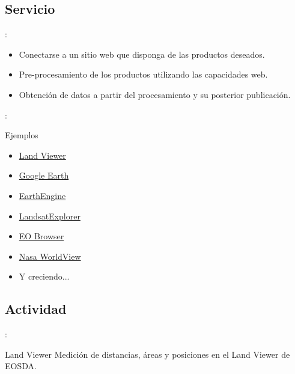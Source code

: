 \documentclass[]{beamer}
\begin{document}
\subsection{Servicio}
\begin{frame}{\secname : \subsecname}
    \begin{itemize}[<+->]
        \item Conectarse a un sitio web que disponga de las productos deseados.
        \item Pre-procesamiento de los productos utilizando las capacidades web.
        \item Obtención de datos a partir del procesamiento y su posterior publicación.
    \end{itemize}
\end{frame}

\begin{frame}{\secname : \subsecname}
    \begin{exampleblock}{Ejemplos}
        \begin{itemize}[<+->]
            \item \href{http://lv.eosda.com}{Land Viewer}
            \item \href{https://earth.google.com/web/}{Google Earth}
            \item \href{https://earthengine.google.com}{EarthEngine}
            \item \href{http://landsatexplorer.esri.com/}{LandsatExplorer}
            \item \href{http://apps.sentinel-hub.com/eo-browser/}{EO Browser}
            \item \href{https://worldview.earthdata.nasa.gov/}{Nasa WorldView}
            \item Y creciendo...
        \end{itemize}
    \end{exampleblock}
\end{frame}

\subsection{Actividad}

\begin{frame}{\secname : \subsecname}
    \begin{alertblock}{Land Viewer}
        Medición de distancias, áreas y posiciones en el Land Viewer de EOSDA.
    \end{alertblock}
\end{frame}
\end{document}
